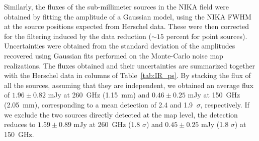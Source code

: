 \documentclass[traditabstract]{aa}
\begin{document}
Similarly, the fluxes of the sub-millimeter sources in the NIKA field were obtained by fitting the amplitude of a Gaussian model, using the NIKA FWHM at the source positions expected from Herschel data. These were then corrected for the filtering induced by the data reduction ($\sim15$ percent for point sources). Uncertainties were obtained from the standard deviation of the amplitudes recovered using Gaussian fits performed on the Monte-Carlo noise map realizations. The fluxes obtained and their uncertainties are summarized together with the Herschel data in columns of Table~\ref{tab:IR_ps}. By stacking the flux of all the sources, assuming that they are independent, we obtained an average flux of $1.96 \pm 0.82$ mJy at 260~GHz (1.15~mm) and $0.46 \pm 0.25$ mJy at 150~GHz (2.05~mm), corresponding to a mean detection of 2.4 and 1.9 $ \ \sigma$, respectively. If we exclude the two sources directly detected at the map level, the detection reduces to $1.59 \pm 0.89$ mJy at 260~GHz (1.8 $\sigma$) and $0.45 \pm 0.25$ mJy (1.8 $\sigma$) at 150~GHz.
\end{document}
